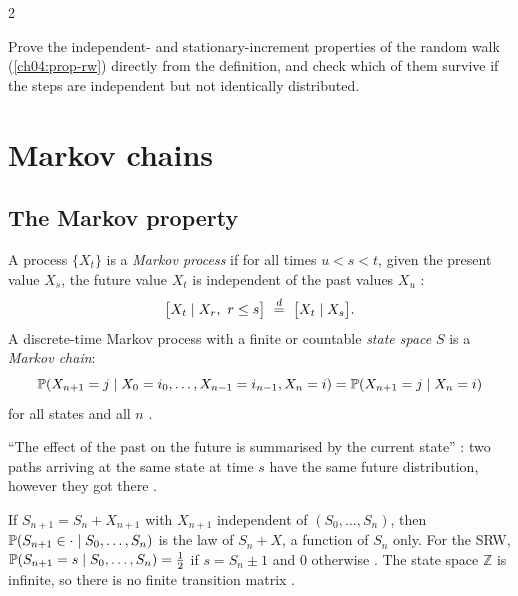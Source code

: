 \begin{paracol}{2}
\begin{exercise}
Prove the independent- and stationary-increment properties of the random walk (\cref{ch04:prop-rw}) directly from
the definition, and check which of them survive if the steps are independent but not identically distributed.
\end{exercise}

\section{Markov chains}\label{ch04:sec-mc}

\subsection{The Markov property}
\begin{definition}\label{ch04:def-markov}
A process $\{X_t\}$ is a \emph{Markov process} if for all times $u<s<t$, given the present value $X_s$,
the future value $X_t$ is independent of the past values $X_u$ :
\[
  \bigl[X_t\mid X_r,\ r\le s\bigr]\ \eqd\ \bigl[X_t\mid X_s\bigr].
\]
A discrete-time Markov process with a finite or countable \emph{state space} $S$ is a \emph{Markov chain}:
\begin{equation}\label{ch04:eq-markov}
  \mathbb{P}(X_{n+1}=j\mid X_0=i_0,\dots,X_{n-1}=i_{n-1},X_n=i)=\mathbb{P}(X_{n+1}=j\mid X_n=i)
\end{equation}
for all states and all $n$ .
\end{definition}
``The effect of the past on the future is summarised by the current state'' : two paths
arriving at the same state at time $s$ have the same future distribution, however they got there
.

\begin{example}
If $S_{n+1}=S_n+X_{n+1}$ with $X_{n+1}$ independent of $(S_0,\dots,S_n)$, then
$\mathbb{P}(S_{n+1}\in\cdot\mid S_0,\dots,S_n)$ is the law of $S_n+X$, a function of $S_n$ only. For the SRW,
$\mathbb{P}(S_{n+1}=s\mid S_0,\dots,S_n)=\tfrac12$ if $s=S_n\pm1$ and $0$ otherwise . The
state space $\mathbb Z$ is infinite, so there is no finite transition matrix .
\end{example}


\end{paracol}
